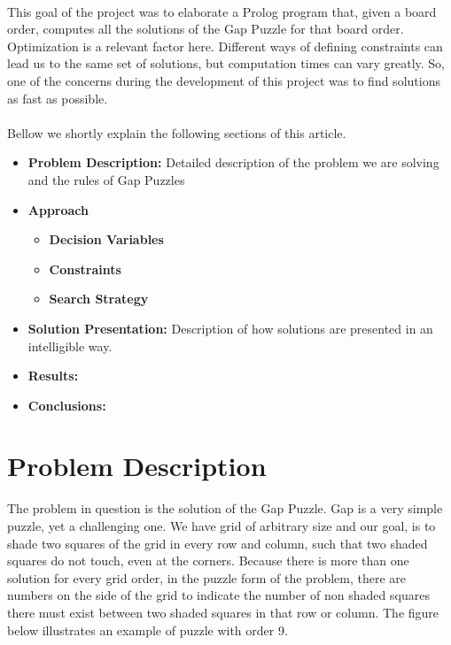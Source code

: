\documentclass[runningheads]{llncs}
\begin{document}
\paragraph{}
This goal of the project was to elaborate a Prolog program that, given a board order, computes all the solutions of the
Gap Puzzle for that board order.
Optimization is a relevant factor here. Different ways of defining constraints can lead us to the same set of
solutions, but computation times can vary greatly. So, one of the concerns during the development of this project
was to find solutions as fast as possible.

\paragraph{}
Bellow we shortly explain the following sections of this article.

\begin{itemize}
    \item \textbf{Problem Description:} Detailed description of the problem we are solving and the rules of Gap Puzzles

    \item \textbf{Approach}
    \begin{itemize}
        \item \textbf{Decision Variables}
        \item \textbf{Constraints}
        \item \textbf{Search Strategy}
    \end{itemize}

    \item \textbf{Solution Presentation:} Description of how solutions are presented in an intelligible way.
    \item \textbf{Results:}
    \item \textbf{Conclusions:}
\end{itemize}

\section{Problem Description}
The problem in question is the solution of the Gap Puzzle. Gap is a very simple puzzle, yet a challenging
one. We have grid of arbitrary size and our goal, is to shade two squares of the grid in every row and column, such that
two shaded squares do not touch, even at the corners. Because there is more than one solution for every grid order,
in the puzzle form of the problem, there are numbers on the side of the grid to indicate the number of non shaded squares
there must exist between two shaded squares in that row or column. The figure below illustrates an example of puzzle with
order 9.
\end{document}
